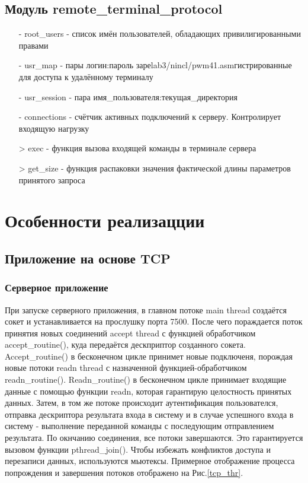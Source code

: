 \subsection{Модуль remote_terminal_protocol}
\begin{itemize}
\item[-] root_users - список имён пользователей, обладающих привилигированными правами
\item[-] usr_map - пары логин:пароль зареlab3/nincl/pwm41.asmгистрированные для доступа к удалённому терминалу
\item[-] usr_session - пара имя_пользователя:текущая_директория
\item[-] connections - счётчик активных подключений к серверу. Контролирует входящую нагрузку 
\item[>] exec - функция вызова входящей команды в терминале сервера
\item[>] get_size - функция распаковки значения фактической длины параметров принятого запроса
\end{itemize}

\section{Особенности реализацции}

\subsection{Приложение на основе TCP}

\subsubsection{Серверное приложение}

При запуске серверного приложения, в главном потоке main thread создаётся сокет и устанавливается на прослушку порта 7500. После чего пораждается поток принятия новых соединений accept thread с функцией обработчиком accept_routine(), куда передаётся дескприптор созданного сокета. Accept_routine() в бесконечном цикле принимет новые подключеня, порождая новые потоки readn thread  с назначенной функцией-обработчиком readn_routine(). Readn_routine() в бесконечном цикле принимает входящие данные с помощью функции readn, которая гарантирую целостность принятых данных. Затем, в том же потоке  происходит аутентификация пользователся, отправка дескриптора результата входа в систему и в случае успешного входа в систему - выполнение переданной команды с последующим отправлением результата. По окнчанию соединения, все потоки завершаются. Это гарантируется вызовом функции pthread_join(). Чтобы избежать конфликтов доступа и перезаписи данных, используются мьютексы. Примерное отображение процесса попрождения и завершения потоков отображено на Рис.\ref{tcp_thr}.

